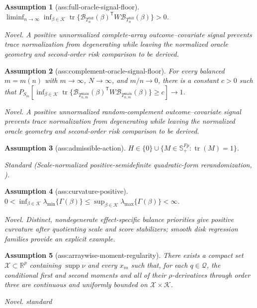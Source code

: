 \documentclass{article}
\newtheorem{assumption}{Assumption}
\begin{document}
\begin{assumption}[ass:full-oracle-signal-floor]\label{ass:full-oracle-signal-floor}
\(\liminf_{n\to\infty}\inf_{\beta\in\mathcal K}\operatorname{tr}\{\mathcal B_{T_n^{\mathrm{full}}}(\beta)^{\mathsf T}W\mathcal B_{T_n^{\mathrm{full}}}(\beta)\}>0\).
\par\smallskip\noindent\emph{Novel.} A positive unnormalized complete-array outcome--covariate signal prevents trace normalization from degenerating while leaving the normalized oracle geometry and second-order risk comparison to be derived.
\end{assumption}

\begin{assumption}[ass:complement-oracle-signal-floor]\label{ass:complement-oracle-signal-floor}
For every balanced \(m=m(n)\) with \(m\to\infty\), \(N\to\infty\), and \(m/n\to0\), there is a constant \(c>0\) such that \(P_{S_m}[\inf_{\beta\in\mathcal K}\operatorname{tr}\{\mathcal B_{T_{n,m}^{\mathrm{main}}}(\beta)^{\mathsf T}W\mathcal B_{T_{n,m}^{\mathrm{main}}}(\beta)\}\ge c]\to1\).
\par\smallskip\noindent\emph{Novel.} A positive unnormalized random-complement outcome--covariate signal prevents trace normalization from degenerating while leaving the normalized oracle geometry and second-order risk comparison to be derived.
\end{assumption}

\begin{assumption}[ass:admissible-action]\label{ass:admissible-action}
\(H\in\{0\}\cup\{M\in\mathbb S_{+}^{Fp}:\operatorname{tr}(M)=1\}\).
\par\smallskip\noindent\emph{Standard} (Scale-normalized positive-semidefinite quadratic-form rerandomization, \cite{SchindlBranson2024QuadraticForms}).
\end{assumption}

\begin{assumption}[ass:curvature-positive]\label{ass:curvature-positive}
\(0<\inf_{\beta\in\mathcal K}\lambda_{\min}\{\Gamma(\beta)\}\le\sup_{\beta\in\mathcal K}\lambda_{\max}\{\Gamma(\beta)\}<\infty\).
\par\smallskip\noindent\emph{Novel.} Distinct, nondegenerate effect-specific balance priorities give positive curvature after quotienting scale and score stabilizers; smooth disk regression families provide an explicit example.
\end{assumption}

\begin{assumption}[ass:arraywise-moment-regularity]\label{ass:arraywise-moment-regularity}
There exists a compact set \(\mathcal X\subset\mathbb R^p\) containing \(\operatorname{supp}\nu\) and every \(x_{in}\) such that, for each \(q\in\mathcal Q\), the conditional first and second moments and all of their \(\rho\)-derivatives through order three are continuous and uniformly bounded on \(\mathcal X\times\mathcal K\).
\par\smallskip\noindent\emph{Novel.} standard
\end{assumption}
\end{document}
